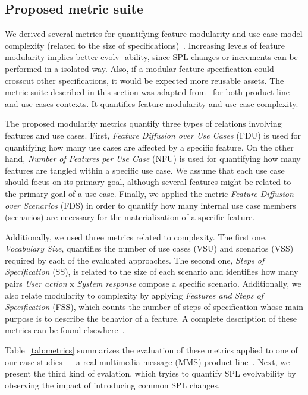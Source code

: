 \documentclass[times, 11pt,twocolumn]{article}
\begin{document}
\subsection{Proposed metric suite}\label{sub:metrics}

We derived several metrics for quantifying feature modularity and use case model
complexity (related to the size of specifications)~\cite{Bonifacio:2008aa}.
Increasing levels of feature modularity implies better evolv- ability, since SPL
changes or increments can be performed in a isolated way. Also, if a modular
feature specification could crosscut other specifications, it would be expected
more reusable assets. The metric suite described in this section was adapted
from~\cite{Garcia:2005aa} for both product line and use cases contexts. It quantifies 
feature modularity and use case complexity. 

The proposed modularity metrics quantify three types of relations involving
features and use cases. First, \emph{Feature Diffusion over Use Cases} (FDU) is
used for quantifying how many use cases are affected by a specific feature. On
the other hand, \emph{Number of Features per Use Case} (NFU) is used for
quantifying how many features are tangled within a specific use case. We assume
that each use case should focus on its primary goal, although several features
might be related to the primary goal of a use case. Finally, we applied the
metric \emph{Feature Diffusion over Scenarios} (FDS) in order to quantify how
many internal use case members (scenarios) are necessary for the materialization
of a specific feature.
 
Additionally, we used three metrics related to complexity. The first one,
\emph{Vocabulary Size}, quantifies the number of use cases (VSU) and scenarios
(VSS) required by each of the evaluated approaches. The second one, \emph{Steps
of Specification} (SS), is related to the size of each scenario and identifies
how many pairs \emph{User action} x \emph{System response} compose a specific
scenario. Additionally, we also relate modularity to complexity by applying
\emph{Features and Steps of Specification} (FSS), which counts the number of
steps of specification whose main purpose is to describe the behavior of a
feature. A complete description of these metrics can be found
elsewhere~\cite{Bonifacio:2008aa}.

Table~\ref{tab:metrics} summarizes the evaluation of these metrics applied to
one of our case studies --- a real multimedia message (MMS) product
line~\cite{Bonifacio:2008aa}. Next, we present the third kind of evalation,
which tryies to quantify SPL evolvability by observing the impact of introducing
common SPL changes.
\end{document}

